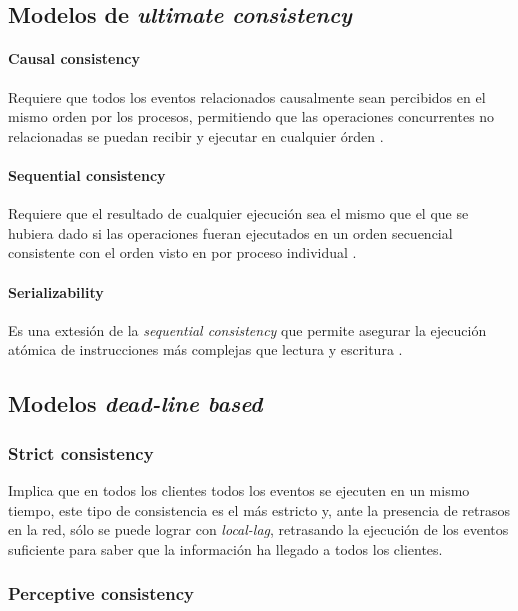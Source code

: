 \subsection{Modelos de \emph{ultimate consistency}}

\paragraph{Causal consistency} Requiere que todos los eventos relacionados causalmente sean percibidos en el mismo orden por los procesos, permitiendo que las operaciones concurrentes no relacionadas se puedan recibir y ejecutar en cualquier órden \cite{lamport1978time}.

\paragraph{Sequential consistency} Requiere que el resultado de cualquier ejecución sea el mismo que el que se hubiera dado si las operaciones fueran ejecutados en un orden secuencial consistente con el orden visto en por proceso individual \cite{lamport1979make}.

\paragraph{Serializability} Es una extesión de la \emph{sequential consistency} que permite asegurar la ejecución atómica de instrucciones más complejas que lectura y escritura \cite{bernstein1987rrency}.

\subsection{Modelos \emph{dead-line based}}

\subsubsection{Strict consistency}

Implica que en todos los clientes todos los eventos se ejecuten en un mismo tiempo, este tipo de consistencia es el más estricto y, ante la presencia de retrasos en la red, sólo se puede lograr con \emph{local-lag}, retrasando la ejecución de los eventos suficiente para saber que la información ha llegado a todos los clientes.

\subsubsection{Perceptive consistency}

